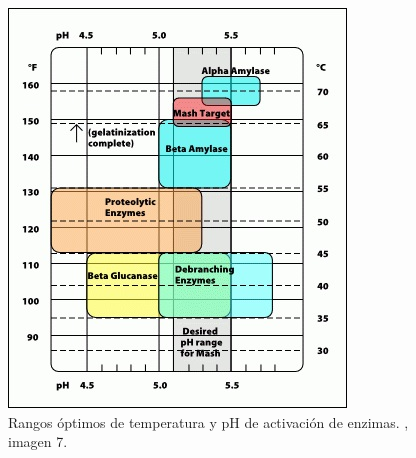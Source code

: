         \begin{figure}[ht]		                                                           \centerline{\includegraphics[scale=1]{activacion_enzimas_t_ph.jpg}}
            \caption{Rangos óptimos de temperatura y pH de activación de enzimas. \cite{Palmer}, imagen 7. }
            \label{ActivacionEnzimasTpH}
        \end{figure}
        
